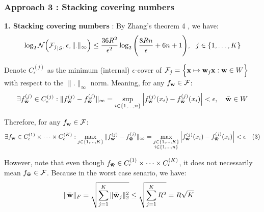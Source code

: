 \subsubsection{Approach 3 : Stacking covering numbers}
\textbf{1. Stacking covering numbers} : By Zhang's theorem 4 \cite{article:tong_zhang}, we have:
\begin{align*}
    \log_2\mathcal{N}\Big( {\mathcal{F}_j}_{|S}, \epsilon, \|.\|_\infty \Big) \le \frac{36R^2}{\epsilon^2}\log_2\Bigg( 
        \frac{8Rn}{\epsilon} + 6n + 1
     \Bigg), \ \ j \in \{ 1, \dots, K \}
\end{align*}

\noindent Denote $C^{(j)}_\epsilon$ as the minimum (internal) $\epsilon$-cover of $\mathcal{F}_j=\Big\{ {\bf x} \mapsto {\bf w}_j {\bf x}: {\bf w}\in W \Big\}$ with respect to the $\|.\|_\infty$ norm. Meaning, for any $f_{\bf w} \in \mathcal{F}$:
\begin{align*}
    \exists f_{\bf \bar w}^{(j)} \in C^{(j)}_\epsilon : \|f_{\bf w}^{(j)} - f_{\bf \bar w}^{(j)} \|_\infty = \sup_{i \in \{1, \dots, n \}}\Big| f_{\bf w}^{(j)}(x_i) - f_{\bf \bar w}^{(j)}(x_i) \Big| < \epsilon, \ \ \ {\bf \bar w}\in W
\end{align*}

\noindent Therefore, for any $f_{\bf w}\in \mathcal{F}$:
\begin{align*}
    \exists f_{\bf \bar w} \in C^{(1)}_\epsilon \times \dots \times C^{(K)}_\epsilon : \max_{j\in \{1, \dots, K \}} \|f_{\bf w}^{(j)} - f_{\bf \bar w}^{(j)}\|_\infty = \max_{
        \substack{ j \in \{1, \dots, K \}\\ i \in \{1, \dots, n\}}
    }\Big| 
        f_{\bf w}^{(j)}(x_i) - f_{\bf \bar w}^{(j)}(x_i) 
     \Big| < \epsilon \ \ \ (3)
\end{align*}

\noindent However, note that even though $f_{\bf \bar w}\in C^{(1)}_\epsilon \times \dots \times C^{(K)}_\epsilon$, it does not necessarily mean $f_{\bf \bar w}\in\mathcal{F}$. Because in the worst case senario, we have:
\begin{align*}
    \|{\bf \bar w}\|_F &= \sqrt{\sum_{j=1}^K \|{\bf \bar w}_j\|_2^2} \le \sqrt{\sum_{j=1}^K R^2} = R\sqrt{K}
\end{align*}

